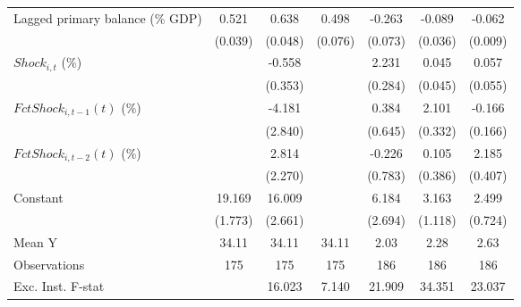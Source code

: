{\begin{tabular}{l*{6}{c}}
\addlinespace
Lagged primary balance (\% GDP)&       0.521\sym{***}&       0.638\sym{***}&       0.498\sym{***}&      -0.263\sym{***}&      -0.089\sym{**} &      -0.062\sym{***}\\
                    &     (0.039)         &     (0.048)         &     (0.076)         &     (0.073)         &     (0.036)         &     (0.009)         \\
\addlinespace
$ Shock_{i,t}$ (\%) &                     &      -0.558         &                     &       2.231\sym{***}&       0.045         &       0.057         \\
                    &                     &     (0.353)         &                     &     (0.284)         &     (0.045)         &     (0.055)         \\
\addlinespace
$ FctShock_{i,t-1}(t)$ (\%)&                     &      -4.181         &                     &       0.384         &       2.101\sym{***}&      -0.166         \\
                    &                     &     (2.840)         &                     &     (0.645)         &     (0.332)         &     (0.166)         \\
\addlinespace
$ FctShock_{i,t-2}(t)$ (\%)&                     &       2.814         &                     &      -0.226         &       0.105         &       2.185\sym{***}\\
                    &                     &     (2.270)         &                     &     (0.783)         &     (0.386)         &     (0.407)         \\
\addlinespace
Constant            &      19.169\sym{***}&      16.009\sym{***}&                     &       6.184\sym{**} &       3.163\sym{**} &       2.499\sym{***}\\
                    &     (1.773)         &     (2.661)         &                     &     (2.694)         &     (1.118)         &     (0.724)         \\
\midrule
Mean Y              &       34.11         &       34.11         &       34.11         &        2.03         &        2.28         &        2.63         \\
Observations        &         175         &         175         &         175         &         186         &         186         &         186         \\
Exc. Inst. F-stat   &                     &      16.023         &       7.140         &      21.909         &      34.351         &      23.037         \\
\bottomrule
\end{tabular}
}
